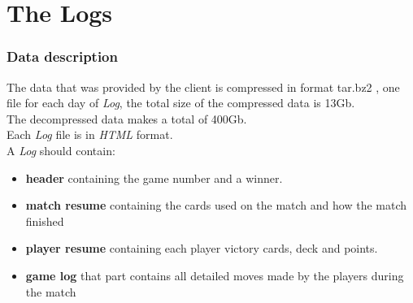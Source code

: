 \documentclass{scrreprt}
\begin{document}



\chapter{The Logs}
\subsection{Data description}
The data that was provided by the client is compressed in format tar.bz2 , one file for each day of \textit{Log}, the total size of the compressed data is
13Gb.\\
The decompressed data makes a total of 400Gb.\\
Each \textit{Log} file is in \textit{HTML} format.\\
A \textit{Log} should contain:
\begin{itemize}
  \item{\textbf{header}} containing the game number and a winner.
  \item{\textbf{match resume}} containing the cards used on the match and how the match
    finished
  \item{\textbf{player resume}} containing each player victory cards, deck and points.
  \item{\textbf{game log}} that part contains all detailed moves made by the players
    during the match
\end{itemize}
\end{document}

